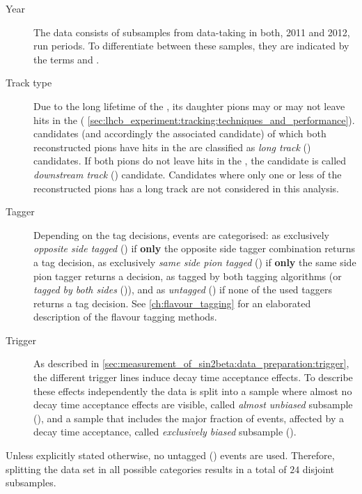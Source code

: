 \begin{description}
  \item[Year] The data consists of subsamples from data-taking in both, 2011
and 2012, run periods. To differentiate between these samples, they are
indicated by the terms \textbf{\catOO} and \textbf{\catOT}.

  \item[Track type] Due to the long lifetime of the \KS, its daughter pions may
or may not leave hits in the \VELO (\cf
\cref{sec:lhcb_experiment:tracking:techniques_and_performance}). \KS candidates
(and accordingly the associated \Bmeson candidate) of which both reconstructed
pions have hits in the \VELO are classified as \emph{long track}
(\textbf{\catLL}) candidates. If both pions do not leave hits in the \VELO, the
candidate is called \emph{downstream track} (\textbf{\catDD}) candidate.
Candidates where only one or less of the reconstructed pions has a long track
are not considered in this analysis.
  
  \item[Tagger] Depending on the tag decisions, events are categorised: as
  exclusively \emph{opposite side tagged} (\textbf{\catOS}) if \textbf{only} the
opposite side tagger combination returns a tag decision, as exclusively
\emph{same side pion tagged} (\textbf{\catSS}) if \textbf{only} the same side
pion tagger returns a decision, as tagged by both tagging algorithms (or
\emph{tagged by both sides} (\textbf{\catBS})), and as \emph{untagged}
(\textbf{\catUT}) if none of the used taggers returns a tag decision. See
\cref{ch:flavour_tagging} for an elaborated description of the flavour tagging
methods.
  
  \item[Trigger] As described in
\cref{sec:measurement_of_sin2beta:data_preparation:trigger}, the different
trigger lines induce decay time acceptance effects. To describe these effects
independently the data is split into a sample where almost no decay time
acceptance effects are visible, called \emph{almost unbiased} subsample
(\textbf{\catAU}), and a sample that includes the major fraction of events,
affected by a decay time acceptance, called \emph{exclusively biased} subsample
(\textbf{\catEB}).
\end{description}

Unless explicitly stated otherwise, no untagged (\textbf{\catUT}) events are
used. Therefore, splitting the data set in all possible categories results in a
total of $\num{24}$ disjoint subsamples.

